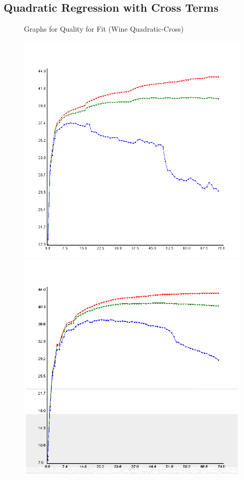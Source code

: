 \documentclass{article}
\begin{document}
	\subsection{Quadratic Regression with Cross Terms} 
	\begin{figure}
	\begin{center}
		
		\caption \newline Graphs for Quality for Fit (Wine Quadratic-Cross)
		
		\includegraphics[scale=0.25]{../plots/Wine/Scala/QuadraticCrossRegressionForwardSel.png}
		\includegraphics[scale=0.25]{../plots/Wine/Scala/QuadraticCrossRegressionBackElim.png}
		

\end{center}
\end{figure}
\end{document}
